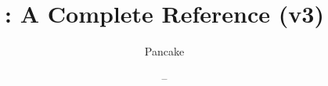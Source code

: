 \documentclass[12pt, a4paper, english, sidefootnotes]{pancake-book}
\begin{document}
\title{\langname : A Complete Reference (v3)}
\author{Pancake}
\date{ -- \DTMtoday}

\frontmatter

\maketitle
\tableofcontents

\printglossaries
\mainmatter


\backmatter

\printbibliography
\end{document}

